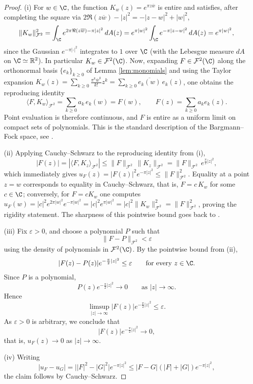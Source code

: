 \begin{proof}
(i) For \(w\in \C\), the function \(K_w(z)=e^{\pi z\overline w}\) is entire and
satisfies, after completing the square via
\(2\Re(z\overline w)-|z|^2=-|z-w|^2+|w|^2\),
\[
\|K_w\|_{\mathcal F^2}^2
=
\int_{\C} e^{2\pi \Re(z\overline w)-\pi |z|^2}\,dA(z)
=
e^{\pi |w|^2}\int_{\C}e^{-\pi |z-w|^2}\,dA(z)
=
e^{\pi |w|^2},
\]
since the Gaussian \(e^{-\pi |\cdot|^2}\) integrates to \(1\) over \(\C\) (with
the Lebesgue measure \(dA\) on \(\C\simeq \mathbb R^2\)). In particular
\(K_w\in \mathcal F^2(\C)\). Now, expanding \(F\in \mathcal F^2(\C)\) along the
orthonormal basis \(\{e_k\}_{k\geq 0}\) of Lemma \ref{lem:monomials} and using
the Taylor expansion
\(K_w(z)=\sum_{k\geq 0}\frac{\pi^k\overline w^k}{k!}z^k=\sum_{k\geq 0}\overline{e_k(w)}\,e_k(z)\),
one obtains the reproducing identity
\[
\langle F,K_w\rangle_{\mathcal F^2}
=
\sum_{k\geq 0} a_k\,e_k(w)
=
F(w),
\qquad F(z)=\sum_{k\geq 0}a_k e_k(z).
\]
Point evaluation is therefore continuous, and \(F\) is entire as a uniform
limit on compact sets of polynomials. This is the standard description of the
Bargmann--Fock space, see \cite{Bargmann,Folland,Grochenig,Zhu}.

(ii) Applying Cauchy--Schwarz to the reproducing identity from (i),
\begin{equation}\label{eq:pointwise}
|F(z)|
=
|\langle F,K_z\rangle_{\mathcal F^2}|
\le
\|F\|_{\mathcal F^2}\,\|K_z\|_{\mathcal F^2}
=
\|F\|_{\mathcal F^2}\,e^{\frac{\pi}{2}|z|^2},
\end{equation}
which immediately gives \(u_F(z)=|F(z)|^2 e^{-\pi |z|^2}\le \|F\|_{\mathcal F^2}^2\).
Equality at a point \(z=w\) corresponds to equality in Cauchy--Schwarz, that is,
\(F=c\,K_w\) for some \(c\in \C\); conversely, for \(F=c K_w\) one computes
\(u_F(w)=|c|^2 e^{2\pi |w|^2}e^{-\pi |w|^2}=|c|^2 e^{\pi |w|^2}=|c|^2\|K_w\|_{\mathcal F^2}^2
=\|F\|_{\mathcal F^2}^2\), proving the rigidity statement. The sharpness of this
pointwise bound goes back to \cite{Lieb}.

(iii) Fix \(\varepsilon>0\), and choose a polynomial \(P\) such that
\[
\|F-P\|_{\mathcal F^2}<\varepsilon
\]
using the density of polynomials in \(\mathcal F^2(\C)\). By the pointwise bound from (ii),
\[
|F(z)-P(z)|e^{-\frac{\pi}{2}|z|^2}\le \varepsilon
\qquad\text{for every }z\in \C.
\]
Since \(P\) is a polynomial,
\[
P(z)e^{-\frac{\pi}{2}|z|^2}\to 0
\qquad\text{as }|z|\to\infty.
\]
Hence
\[
\limsup_{|z|\to\infty}|F(z)|e^{-\frac{\pi}{2}|z|^2}\le \varepsilon.
\]
As \(\varepsilon>0\) is arbitrary, we conclude that
\[
|F(z)|e^{-\frac{\pi}{2}|z|^2}\to 0,
\]
that is, \(u_F(z)\to 0\) as \(|z|\to\infty\).

(iv) Writing
\[
|u_F - u_G|
= \big||F|^2 - |G|^2\big| e^{-\pi|z|^2}
\le |F-G|(|F|+|G|) e^{-\pi|z|^2},
\]
the claim follows by Cauchy--Schwarz.
\end{proof}

